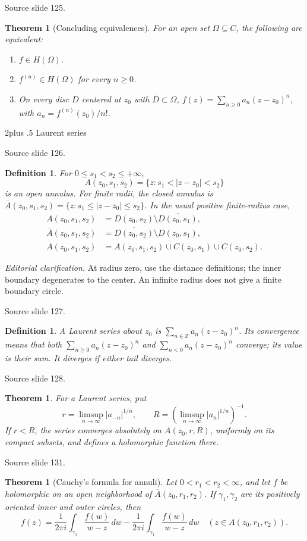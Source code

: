 \documentclass[10pt,letterpaper,twoside,openright]{amsbook}
\makeatletter
\numberwithin{equation}{subsection}
\renewcommand{\section}{\@startsection{section}{1}
 {\z@}{2\baselineskip plus .5\baselineskip}
 {\baselineskip}{\normalfont\Large\bfseries\centering}}
\theoremstyle{sea-plain}
\newtheorem{theorem}[subsection]{Theorem}
\theoremstyle{sea-definition}
\newtheorem{definition}[subsection]{Definition}
\theoremstyle{sea-exercise}
\newcommand{\ZZ}{\mathbb{Z}}
\newcommand{\RR}{\mathbb{R}}
\newcommand{\CC}{\mathbb{C}}
\newcommand{\DD}{\mathbb{D}}
\newcommand{\HH}{\mathbb{H}}
\newcommand{\Chat}{\mathbb{C}_{\infty}}
\def\CC{C}\def\RR{R}\def\DD{D}\def\HH{H}\def\Chat{C infinity}}
\newcommand{\src}[1]{\par\smallskip\noindent
 {\scriptsize\sffamily\color{SoftWhite}Source slide #1.}\par\nopagebreak\smallskip}
\newcommand{\editorial}[1]{\par\smallskip\noindent
 {\small\textit{Editorial clarification.} #1}\par\smallskip}
\makeatother
\begin{document}
\src{125}
\begin{theorem}[Concluding equivalences]
For an open set $\Omega\subseteq\CC$, the following are equivalent:
\begin{enumerate}
\item $f\in H(\Omega)$.
\item $f^{(n)}\in H(\Omega)$ for every $n\ge0$.
\item On every disc $D$ centered at $z_0$ with $\overline D\subset\Omega$,
$f(z)=\sum_{n\ge0}a_n(z-z_0)^n$, with $a_n=f^{(n)}(z_0)/n!$.
\end{enumerate}
\end{theorem}
\section{Laurent series}
\src{126}
\begin{definition}
For $0\le s_1<s_2\le+\infty$,
\[
A(z_0,s_1,s_2)=\{z:s_1<|z-z_0|<s_2\}
\]
is an open annulus. For finite radii, the closed annulus is
$\overline A(z_0,s_1,s_2)=\{z:s_1\le|z-z_0|\le s_2\}$.
In the usual positive finite-radius case,
\begin{align*}
A(z_0,s_1,s_2)&=D(z_0,s_2)\setminus\overline{D(z_0,s_1)},\\
\overline A(z_0,s_1,s_2)&=\overline{D(z_0,s_2)}\setminus D(z_0,s_1),\\
\overline A(z_0,s_1,s_2)&=A(z_0,s_1,s_2)\cup C(z_0,s_1)\cup C(z_0,s_2).
\end{align*}
\end{definition}
\editorial{At radius zero, use the distance definitions;
the inner boundary degenerates to the center. An infinite radius
does not give a finite boundary circle.}
\src{127}
\begin{definition}
A \emph{Laurent series} about $z_0$ is
$\sum_{n\in\ZZ}a_n(z-z_0)^n$. Its convergence means that both
$\sum_{n\ge0}a_n(z-z_0)^n$ and $\sum_{n<0}a_n(z-z_0)^n$
converge; its value is their sum. It diverges if either tail diverges.
\end{definition}
\src{128}
\begin{theorem}
For a Laurent series, put
\[
r=\limsup_{n\to\infty}|a_{-n}|^{1/n},\qquad
R=\left(\limsup_{n\to\infty}|a_n|^{1/n}\right)^{-1}.
\]
If $r<R$, the series converges absolutely on $A(z_0,r,R)$,
uniformly on its compact subsets, and defines a holomorphic function there.
\end{theorem}
\src{131}
\begin{theorem}[Cauchy's formula for annuli]
Let $0<r_1<r_2<\infty$, and let $f$ be holomorphic on an open
neighborhood of $\overline A(z_0,r_1,r_2)$. If $\gamma_1,\gamma_2$
are its positively oriented inner and outer circles, then
\[
f(z)=\frac1{2\pi i}\int_{\gamma_2}\frac{f(w)}{w-z}\,dw
-\frac1{2\pi i}\int_{\gamma_1}\frac{f(w)}{w-z}\,dw
\quad(z\in A(z_0,r_1,r_2)).
\]
\end{theorem}
\end{document}
